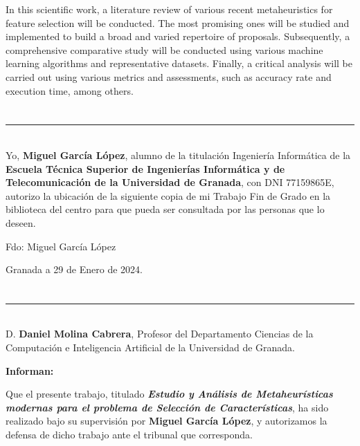 In this scientific work, a literature review of various recent metaheuristics for feature selection will be conducted. The most promising ones will be studied and implemented to build a broad and varied repertoire of proposals. Subsequently, a comprehensive comparative study will be conducted using various machine learning algorithms and representative datasets. Finally, a critical analysis will be carried out using various metrics and assessments, such as accuracy rate and execution time, among others.\\[6pt]

\chapter*{}
\thispagestyle{empty}

\noindent\rule[-1ex]{\textwidth}{2pt}\\[4.5ex]

Yo, \textbf{Miguel García López}, alumno de la titulación Ingeniería Informática de la \textbf{Escuela Técnica Superior
de Ingenierías Informática y de Telecomunicación de la Universidad de Granada}, con DNI 77159865E, autorizo la
ubicación de la siguiente copia de mi Trabajo Fin de Grado en la biblioteca del centro para que pueda ser
consultada por las personas que lo deseen.

\vspace{6cm}

\noindent Fdo: Miguel García López

\vspace{2cm}

\begin{flushright}
Granada a 29 de Enero de 2024.
\end{flushright}


\chapter*{}
\thispagestyle{empty}

\noindent\rule[-1ex]{\textwidth}{2pt}\\[4.5ex]

D. \textbf{Daniel Molina Cabrera}, Profesor del Departamento Ciencias de la Computación e Inteligencia Artificial de la Universidad de Granada.

\vspace{0.5cm}
\textbf{Informan:}

\vspace{0.5cm}

Que el presente trabajo, titulado \textit{\textbf{Estudio y Análisis de Metaheurísticas modernas para el problema de Selección de Características}},
ha sido realizado bajo su supervisión por \textbf{Miguel García López}, y autorizamos la defensa de dicho trabajo ante el tribunal
que corresponda.

